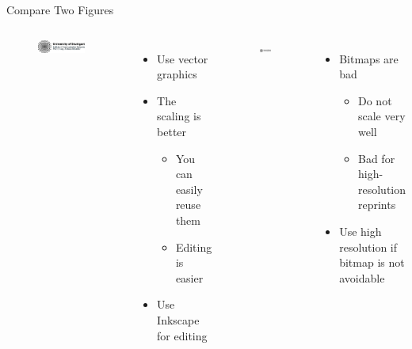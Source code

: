 \documentclass[english,american,german,aspectratio=169]{beamer}
\begin{document}
\begin{frame}{Compare Two Figures}

  \begin{columns}[t]
    \noindent


    \noindent
    \begin{figure}
      \centering{}\includegraphics[width=0.9\textwidth]{img/logo_vector_example}
    \end{figure}

    \begin{itemize}
      \item Use vector graphics
      \item The scaling is better

        \begin{itemize}
          \item You can easily reuse them
          \item Editing is easier
        \end{itemize}
      \item Use Inkscape for editing
    \end{itemize}


    \begin{figure}
      \centering{}\includegraphics[width=0.9\textwidth]{img/logo_bitmap_example}
    \end{figure}

    \begin{itemize}
      \item Bitmaps are bad

        \begin{itemize}
          \item Do not scale very well
          \item Bad for high-resolution reprints
        \end{itemize}
      \item Use high resolution if bitmap is not avoidable
    \end{itemize}
  \end{columns}

\end{frame}
\end{document}
